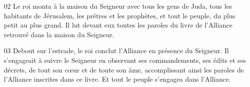 02 Le roi monta à la maison du Seigneur avec tous les gens de Juda, tous les habitants de Jérusalem, les prêtres et les prophètes, et tout le peuple, du plus petit au plus grand. Il lut devant eux toutes les paroles du livre de l’Alliance retrouvé dans la maison du Seigneur.

03 Debout sur l’estrade, le roi conclut l’Alliance en présence du Seigneur. Il s’engageait à suivre le Seigneur en observant ses commandements, ses édits et ses décrets, de tout son cœur et de toute son âme, accomplissant ainsi les paroles de l’Alliance inscrites dans ce livre. Et tout le peuple s’engagea dans l’Alliance.
